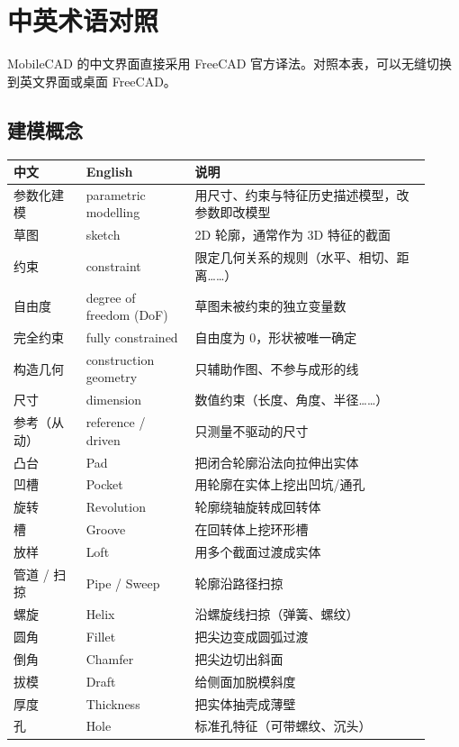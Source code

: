 \chapter{中英术语对照}

MobileCAD 的中文界面直接采用 FreeCAD 官方译法。对照本表，可以无缝切换到英文界面或桌面 FreeCAD。

\section{建模概念}

\begin{longtable}{@{}p{0.16\linewidth}p{0.24\linewidth}p{0.52\linewidth}@{}}
\toprule \textbf{中文} & \textbf{English} & \textbf{说明} \\ \midrule \endhead
参数化建模 & parametric modelling & 用尺寸、约束与特征历史描述模型，改参数即改模型 \\
草图 & sketch & 2D 轮廓，通常作为 3D 特征的截面 \\
约束 & constraint & 限定几何关系的规则（水平、相切、距离……） \\
自由度 & degree of freedom (DoF) & 草图未被约束的独立变量数 \\
完全约束 & fully constrained & 自由度为 0，形状被唯一确定 \\
构造几何 & construction geometry & 只辅助作图、不参与成形的线 \\
尺寸 & dimension & 数值约束（长度、角度、半径……） \\
参考（从动） & reference / driven & 只测量不驱动的尺寸 \\
凸台 & Pad & 把闭合轮廓沿法向拉伸出实体 \\
凹槽 & Pocket & 用轮廓在实体上挖出凹坑/通孔 \\
旋转 & Revolution & 轮廓绕轴旋转成回转体 \\
槽 & Groove & 在回转体上挖环形槽 \\
放样 & Loft & 用多个截面过渡成实体 \\
管道 / 扫掠 & Pipe / Sweep & 轮廓沿路径扫掠 \\
螺旋 & Helix & 沿螺旋线扫掠（弹簧、螺纹） \\
圆角 & Fillet & 把尖边变成圆弧过渡 \\
倒角 & Chamfer & 把尖边切出斜面 \\
拔模 & Draft & 给侧面加脱模斜度 \\
厚度 & Thickness & 把实体抽壳成薄壁 \\
孔 & Hole & 标准孔特征（可带螺纹、沉头） \\

\end{longtable}
